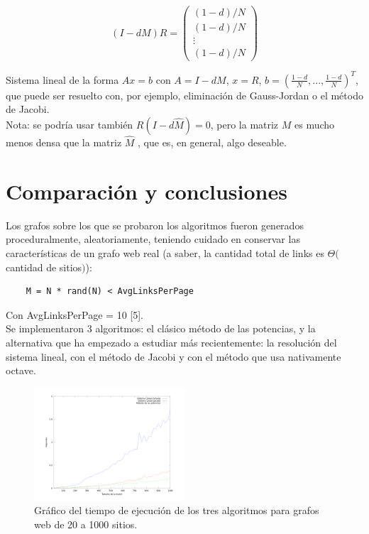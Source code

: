 \documentclass[%
    final,
    notitlepage,
    narroweqnarray,
    inline,
    twoside,
    invited
    ]{lib/ieee}
\begin{document}
\begin{equation}
    (I - dM) R = \begin{pmatrix}
                     (1-d)/N \\ (1-d)/N \\ \vdots \\ (1-d)/N
                 \end{pmatrix}
\end{equation}

Sistema lineal de la forma $Ax = b$ con $A = I - dM$, $x = R$, $b = (\tfrac{1-d}{N},...,\tfrac{1-d}{N})^T$, que puede ser resuelto con, por ejemplo,
 eliminación de Gauss-Jordan o el método de Jacobi.\\

Nota: se podría usar también $R(I-d\widehat{M}) = 0$, pero la matriz $M$ es mucho menos densa que la matriz $\widehat{M}$ , que es, en
 general, algo deseable.

\section{Comparación y conclusiones}


Los grafos sobre los que se probaron los algoritmos fueron generados proceduralmente, aleatoriamente,
teniendo cuidado en conservar las características de un grafo web real (a saber, la cantidad total de links es
$\Theta($cantidad de sitios$)$):

\lstset{language=Octave,basicstyle=\footnotesize}

\begin{lstlisting}
    M = N * rand(N) < AvgLinksPerPage
\end{lstlisting}

Con AvgLinksPerPage = 10 [5].\\

Se implementaron 3 algoritmos: el clásico método de las potencias, y la alternativa que ha empezado a estudiar más recientemente: la resolución del
sistema lineal, con el método de Jacobi y con el método que usa nativamente octave.

\begin{figure}[h!]
    \centering
    \includegraphics[width=0.5\textwidth]{img/octave_jacobi_pm.png} %
    \caption{Gráfico del tiempo de ejecución de los tres algoritmos para grafos web de 20 a 1000 sitios.}
\end{figure}
\end{document}
